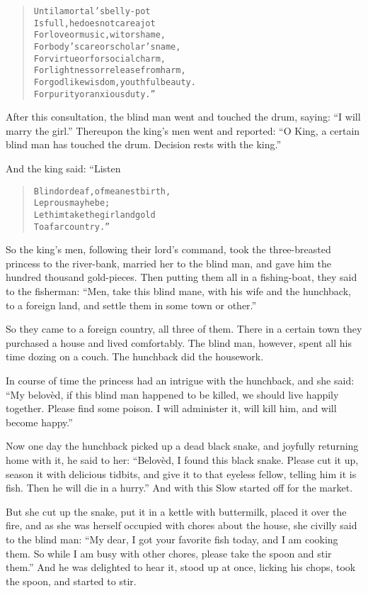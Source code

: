 \documentclass[article, twoside, 14pt]{memoir}
\renewenvironment{verbatim}{%
\begin{quote}%
\vskip -10pt%
\begin{alltt}\normalfont\large}{\end{alltt}%
\end{quote}%
\vskip -10pt
} %
\begin{document}
\begin{verbatim}
Until a mortal's belly-pot
Is full, he does not care a jot
For love or music, wit or shame,
For body's care or scholar's name,
For virtue or for social charm,
For lightness or release from harm,
For godlike wisdom, youthful beauty.
For purity or anxious duty.”
\end{verbatim}
After this consultation, the blind man went and touched the drum,
saying: ``I will marry the girl.'' Thereupon the king's men went
and reported:
``O King, a certain blind man has touched the drum. Decision rests with the king.''

And the king said: “Listen

\begin{verbatim}
Blind or deaf, of meanest birth,
    Leprous may he be;
Let him take the girl and gold
    To a far country.”
\end{verbatim}
So the king's men, following their lord's command, took the
three-breasted princess to the river-bank, married her to the blind
man, and gave him the hundred thousand gold-pieces. Then putting
them all in a fishing-boat, they said to the fisherman:
``Men, take this blind mane, with his wife and the hunchback, to a foreign land, and settle them in some town or other.''

So they came to a foreign country, all three of them. There in a
certain town they purchased a house and lived comfortably. The
blind man, however, spent all his time dozing on a couch. The
hunchback did the housework.

In course of time the princess had an intrigue with the hunchback,
and she said:
``My belovèd, if this blind man happened to be killed, we should live happily together. Please find some poison. I will administer it, will kill him, and will become happy.''

Now one day the hunchback picked up a dead black snake, and
joyfully returning home with it, he said to her:
``Belovèd, I found this black snake. Please cut it up, season it with delicious tidbits, and give it to that eyeless fellow, telling him it is fish. Then he will die in a hurry.''
And with this Slow started off for the market.

But she cut up the snake, put it in a kettle with buttermilk,
placed it over the fire, and as she was herself occupied with
chores about the house, she civilly said to the blind man:
``My dear, I got your favorite fish today, and I am cooking them. So while I am busy with other chores, please take the spoon and stir them.''
And he was delighted to hear it, stood up at once, licking his
chops, took the spoon, and started to stir.
\end{document}
